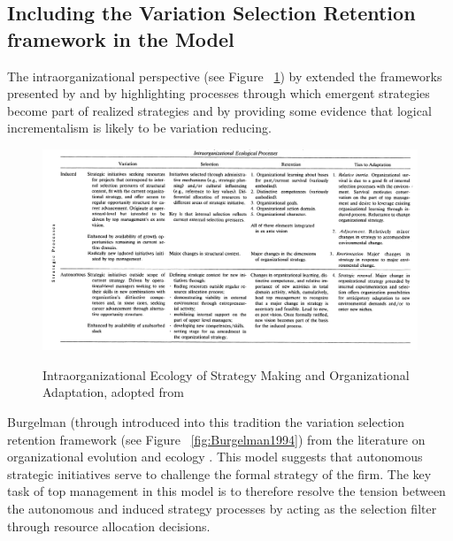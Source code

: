 \documentclass[12pt,letterpaper]{article}
\begin{document}
\subsection{Including the Variation Selection Retention framework in the \cite{Burgelman1991, Burgelman1994} Model}

The intraorganizational perspective (see Figure ~\ref{fig:Burgelman1991}) by \cite{Burgelman1991} extended the frameworks presented by \cite{Mintzberg1978} and \cite{Quinn1980} by highlighting  processes through which emergent strategies become part of realized strategies and by providing some evidence that logical incrementalism is likely to be variation reducing. 

\begin{figure}[h]
\begin{centering}
  \caption{Intraorganizational Ecology of Strategy Making and Organizational Adaptation, adopted from \cite{Burgelman1991}}
  \includegraphics[width=\textwidth]{Burgelman1991}
  \label{fig:Burgelman1991}
\end{centering}
\end{figure}

Burgelman (through \cite{Burgelman1991, Burgelman1994} introduced into this tradition the variation selection retention framework (see Figure ~\ref{fig:Burgelman1994}) from the literature on organizational evolution and ecology \citep{Campbell1965, Nelson1982}. This model suggests that autonomous strategic initiatives serve to challenge the formal strategy of the firm. The key task of top management in this model is to therefore resolve the tension between the autonomous and induced strategy processes by acting as the selection filter through resource allocation decisions.
\end{document}
